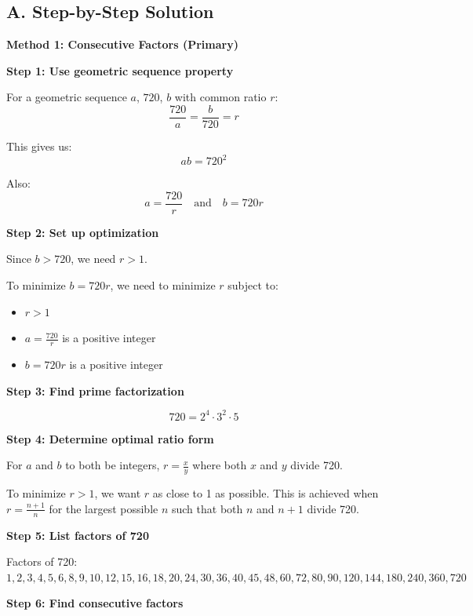 \documentclass[11pt]{article}
\begin{document}
\begin{solutionbox}
\subsection*{A. Step-by-Step Solution}

\textbf{Method 1: Consecutive Factors (Primary)}

\textbf{Step 1: Use geometric sequence property}

For a geometric sequence $a$, $720$, $b$ with common ratio $r$:
\[
\frac{720}{a} = \frac{b}{720} = r
\]

This gives us:
\[
ab = 720^2
\]

Also:
\[
a = \frac{720}{r} \quad \text{and} \quad b = 720r
\]

\textbf{Step 2: Set up optimization}

Since $b > 720$, we need $r > 1$.

To minimize $b = 720r$, we need to minimize $r$ subject to:
\begin{itemize}
    \item $r > 1$
    \item $a = \frac{720}{r}$ is a positive integer
    \item $b = 720r$ is a positive integer
\end{itemize}

\textbf{Step 3: Find prime factorization}

\[
720 = 2^4 \cdot 3^2 \cdot 5
\]

\textbf{Step 4: Determine optimal ratio form}

For $a$ and $b$ to both be integers, $r = \frac{x}{y}$ where both $x$ and $y$ divide 720.

To minimize $r > 1$, we want $r$ as close to 1 as possible. This is achieved when $r = \frac{n+1}{n}$ for the largest possible $n$ such that both $n$ and $n+1$ divide 720.

\textbf{Step 5: List factors of 720}

Factors of 720: $1, 2, 3, 4, 5, 6, 8, 9, 10, 12, 15, 16, 18, 20, 24, 30, 36, 40, 45, 48, 60, 72, 80, 90, 120, 144, 180, 240, 360, 720$

\textbf{Step 6: Find consecutive factors}


\end{solutionbox}
\end{document}
